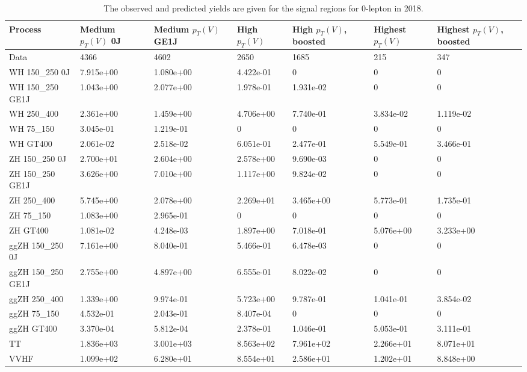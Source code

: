 \begin{table}
\centering
\caption[2018 0-lepton signal selection yields]{
                  The observed and predicted yields are given for the
                  signal regions for 0-lepton in 2018.
                  }
{\footnotesize
\begin{tabularx}{\textwidth}{|X|X|X|X|X|X|X|}
\hline
Process & Medium $p_{T}(V)$ 0J & Medium $p_{T}(V)$ GE1J & High $p_{T}(V)$ & High $p_{T}(V)$, boosted & Highest $p_{T}(V)$ & Highest $p_{T}(V)$, boosted \\
\hline
Data & 4366 & 4602 & 2650 & 1685 & 215 & 347 \\
\hline
WH 150\_250 0J & 7.915e+00 & 1.080e+00 & 4.422e-01 & 0 & 0 & 0 \\
WH 150\_250 GE1J & 1.043e+00 & 2.077e+00 & 1.978e-01 & 1.931e-02 & 0 & 0 \\
WH 250\_400 & 2.361e+00 & 1.459e+00 & 4.706e+00 & 7.740e-01 & 3.834e-02 & 1.119e-02 \\
WH 75\_150 & 3.045e-01 & 1.219e-01 & 0 & 0 & 0 & 0 \\
WH GT400 & 2.061e-02 & 2.518e-02 & 6.051e-01 & 2.477e-01 & 5.549e-01 & 3.466e-01 \\
ZH 150\_250 0J & 2.700e+01 & 2.604e+00 & 2.578e+00 & 9.690e-03 & 0 & 0 \\
ZH 150\_250 GE1J & 3.626e+00 & 7.010e+00 & 1.117e+00 & 9.824e-02 & 0 & 0 \\
ZH 250\_400 & 5.745e+00 & 2.078e+00 & 2.269e+01 & 3.465e+00 & 5.773e-01 & 1.735e-01 \\
ZH 75\_150 & 1.083e+00 & 2.965e-01 & 0 & 0 & 0 & 0 \\
ZH GT400 & 1.081e-02 & 4.248e-03 & 1.897e+00 & 7.018e-01 & 5.076e+00 & 3.233e+00 \\
ggZH 150\_250 0J & 7.161e+00 & 8.040e-01 & 5.466e-01 & 6.478e-03 & 0 & 0 \\
ggZH 150\_250 GE1J & 2.755e+00 & 4.897e+00 & 6.555e-01 & 8.022e-02 & 0 & 0 \\
ggZH 250\_400 & 1.339e+00 & 9.974e-01 & 5.723e+00 & 9.787e-01 & 1.041e-01 & 3.854e-02 \\
ggZH 75\_150 & 4.532e-01 & 2.043e-01 & 8.407e-04 & 0 & 0 & 0 \\
ggZH GT400 & 3.370e-04 & 5.812e-04 & 2.378e-01 & 1.046e-01 & 5.053e-01 & 3.111e-01 \\
\hline
TT & 1.836e+03 & 3.001e+03 & 8.563e+02 & 7.961e+02 & 2.266e+01 & 8.071e+01 \\
VVHF & 1.099e+02 & 6.280e+01 & 8.554e+01 & 2.586e+01 & 1.202e+01 & 8.848e+00 \\

\end{tabularx}}
\end{table}
